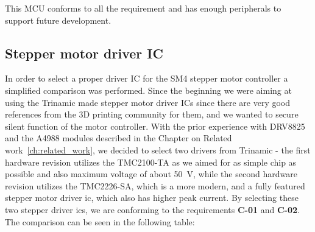 This MCU conforms to all the requirement and has enough peripherals to support future development.

\subsection{Stepper motor driver IC}
\label{subsec:stepper_ic}
In order to select a proper driver IC for the SM4 stepper motor controller a simplified comparison was performed.
Since the beginning we were aiming at using the Trinamic made stepper motor driver ICs since there are very good references from the 3D printing community\cite{prusa_original_2017,prusa_original_2019,3daddict_stepper_2020} for them, and we wanted to secure silent function of the motor controller.
With the prior experience with DRV8825 and the A4988 modules described in the Chapter on Related work~\ref{ch:related_work}, we decided to select two drivers from Trinamic - the first hardware revision utilizes the TMC2100-TA as we aimed for as simple chip as possible and also maximum voltage of about 50~V, while the second hardware revision utilizes the TMC2226-SA, which is a more modern, and a fully featured stepper motor driver \acs{ic}, which also has higher peak current.
By selecting these two stepper driver \acs{ic}s, we are conforming to the requirements \textbf{C-01} and \textbf{C-02}.
The comparison can be seen in the following table:

